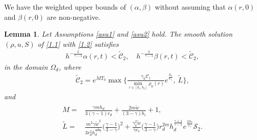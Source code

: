 \documentclass[11pt,reqno]{article}
\newtheorem{lem}{Lemma}[section]
\newcommand{\dps}{\displaystyle}
\newcommand{\fr}{\frac}
\numberwithin{equation}{section}
\begin{document}
We have the weighted upper bounds of $(\alpha, \beta)$ without assuming that $\alpha(r,0)$ and $\beta(r,0)$ are non-negative.
\begin{lem}\label{lem7}
Let Assumptions \ref{asu1} and \ref{asu2} hold. The smooth solution $(\rho, u, S)$ of \eqref{1.1} with \eqref{1.2} satisfies
\begin{align}\label{4.24}
h^{-\fr{2}{\gamma-1}}\alpha(r,t)< \widetilde{\mathcal{C}}_2,\quad h^{-\fr{2}{\gamma-1}}\beta(r,t)< \widetilde{\mathcal{C}}_2,
\end{align}
in the domain $\Omega_d$, where
\begin{align}\label{4.25}
\widetilde{\mathcal{C}}_2=e^{MT_0} \max\bigg\{\fr{\gamma_k\mathcal{C}_1}{\dps\min_{r\in[b_1,b_2]}\rho_0(r)} e^{\fr{\mathcal{S}_0}{c_\gamma}},\ \widetilde{L}\bigg\},
\end{align}
and
\begin{align}\label{a6}
\begin{split}
M=&\fr{\gamma mh_d}{3(\gamma-1)r_d}+\fr{2m\tilde{w}}{(3-\gamma)b_1} +1, \\[4pt]
\widetilde{L}=&\fr{m^2\gamma \tilde{w}^2}{3r_{d}^2h_{d}^{\fr{2}{\gamma-1}}} \Big(\fr{\gamma-1}{3-\gamma}\Big)^2 +\fr{\gamma_{k}^2\tilde{w}}{\gamma c_v }\Big(\fr{\gamma-1}{3-\gamma}\Big)r_{d}^{2m}h_{d}^{\fr{\gamma+1}{\gamma-1}} e^{\fr{2\mathcal{S}_0}{c_\gamma}}\mathcal{S}_2.
\end{split}
\end{align}
\end{lem}
\end{document}
